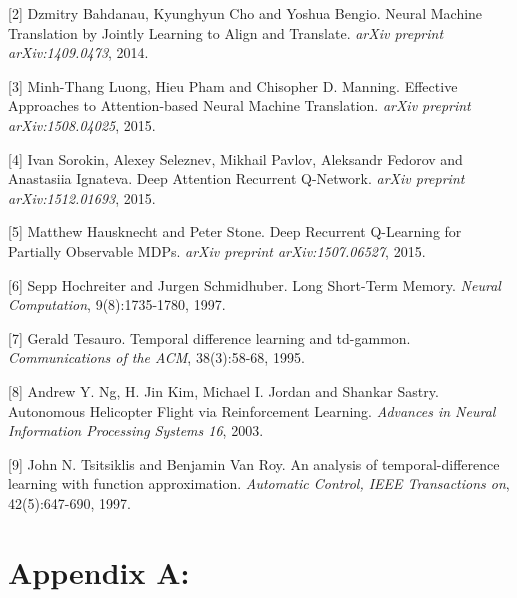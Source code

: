 \documentclass{article}
\begin{document}
[2] Dzmitry Bahdanau, Kyunghyun Cho and Yoshua Bengio. Neural Machine Translation by Jointly Learning to Align and Translate. {\it arXiv preprint arXiv:1409.0473}, 2014.

[3] Minh-Thang Luong, Hieu Pham and Chisopher D. Manning. Effective Approaches to Attention-based Neural Machine Translation. {\it arXiv preprint arXiv:1508.04025}, 2015.

[4] Ivan Sorokin, Alexey Seleznev, Mikhail Pavlov, Aleksandr Fedorov and Anastasiia Ignateva. Deep Attention Recurrent Q-Network. {\it arXiv preprint arXiv:1512.01693}, 2015.

[5] Matthew Hausknecht and Peter Stone. Deep Recurrent Q-Learning for Partially Observable MDPs. {\it arXiv preprint arXiv:1507.06527}, 2015.

[6] Sepp Hochreiter and Jurgen Schmidhuber. Long Short-Term Memory. {\it Neural Computation}, 9(8):1735-1780, 1997.

[7] Gerald Tesauro. Temporal difference learning and td-gammon. {\it Communications of the ACM}, 38(3):58-68, 1995.

[8] Andrew Y. Ng, H. Jin Kim, Michael I. Jordan and Shankar Sastry. Autonomous Helicopter Flight via Reinforcement Learning. {\it Advances in Neural Information Processing Systems 16}, 2003.

[9] John N. Tsitsiklis and Benjamin Van Roy. An analysis of temporal-difference learning with function approximation. {\it Automatic Control, IEEE Transactions on}, 42(5):647-690, 1997.


\section*{Appendix A:}
\end{document}
